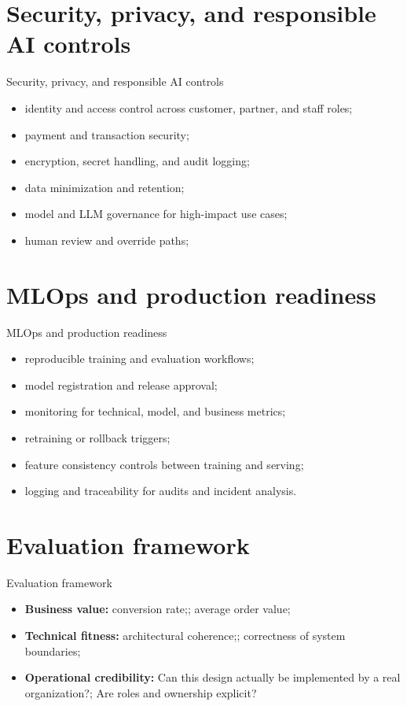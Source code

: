 \documentclass[aspectratio=169]{beamer}
\begin{document}
\section{Security, privacy, and responsible AI controls}

\begin{frame}{Security, privacy, and responsible AI controls}
  \begin{itemize}
    \item identity and access control across customer, partner, and staff roles;
    \item payment and transaction security;
    \item encryption, secret handling, and audit logging;
    \item data minimization and retention;
    \item model and LLM governance for high-impact use cases;
    \item human review and override paths;
  \end{itemize}
\end{frame}

\section{MLOps and production readiness}

\begin{frame}{MLOps and production readiness}
  \begin{itemize}
    \item reproducible training and evaluation workflows;
    \item model registration and release approval;
    \item monitoring for technical, model, and business metrics;
    \item retraining or rollback triggers;
    \item feature consistency controls between training and serving;
    \item logging and traceability for audits and incident analysis.
  \end{itemize}
\end{frame}

\section{Evaluation framework}

\begin{frame}{Evaluation framework}
  \begin{itemize}
    \item \textbf{Business value:} conversion rate;; average order value;
    \item \textbf{Technical fitness:} architectural coherence;; correctness of system boundaries;
    \item \textbf{Operational credibility:} Can this design actually be implemented by a real organization?; Are roles and ownership explicit?
  \end{itemize}
\end{frame}
\end{document}
